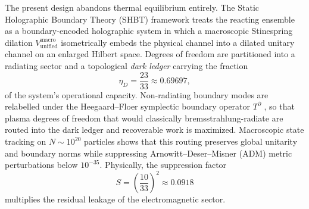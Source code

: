 \documentclass[11pt,journal,compsoc]{IEEEtran}
\begin{document}
The present design abandons thermal equilibrium entirely. The Static
Holographic Boundary Theory (SHBT) framework treats the reacting ensemble
as a boundary-encoded holographic system in which a macroscopic
Stinespring dilation $V_{\mathrm{unified}}^{\mathrm{macro}}$ isometrically
embeds the physical channel into a dilated unitary channel on an enlarged
Hilbert space. Degrees of freedom are partitioned into a radiating sector
and a topological \emph{dark ledger} carrying the fraction
\begin{equation}
\eta_D = \frac{23}{33} \approx 0.69697,
\label{eq:darkledger}
\end{equation}
of the system's operational capacity. Non-radiating boundary modes are
relabelled under the Heegaard--Floer symplectic boundary operator
$T^\partial$ \cite{sys1own_shbt2026,sys1own_twin2026}, so that plasma degrees of freedom that would classically
bremsstrahlung-radiate are routed into the dark ledger and recoverable
work is maximized. Macroscopic state tracking on $N \sim 10^{20}$
particles shows that this routing preserves global unitarity and boundary
norms while suppressing Arnowitt--Deser--Misner (ADM) \cite{adm} metric perturbations
below $10^{-35}$. Physically, the suppression factor
\begin{equation}
S = \left(\frac{10}{33}\right)^2 \approx 0.0918
\label{eq:suppression}
\end{equation}
multiplies the residual leakage of the electromagnetic sector.
\end{document}
